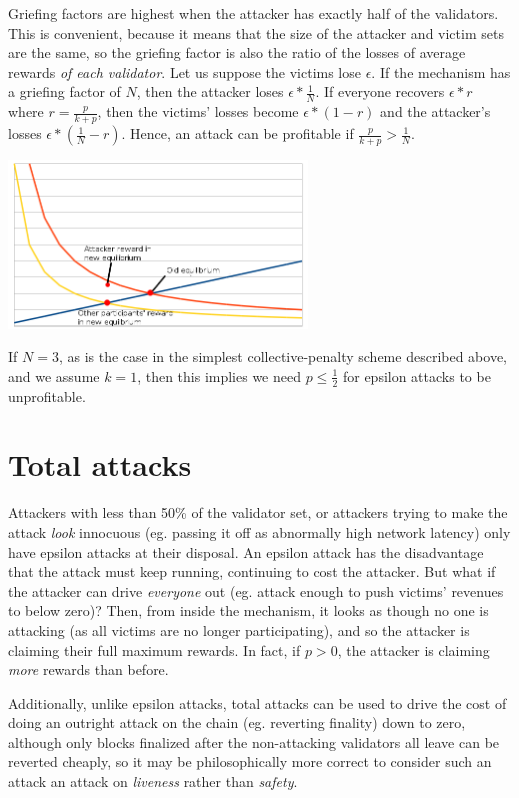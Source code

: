 \documentclass[12pt]{article}
\begin{document}
Griefing factors are highest when the attacker has exactly half of the validators. This is convenient, because it means that the size of the attacker and victim sets are the same, so the griefing factor is also the ratio of the losses of average rewards \emph{of each validator}. Let us suppose the victims lose $\epsilon$. If the mechanism has a griefing factor of $N$, then the attacker loses $\epsilon * \frac{1}{N}$. If everyone recovers $\epsilon * r$ where $r = \frac{p}{k+p}$, then the victims' losses become $\epsilon * (1-r)$ and the attacker's losses $\epsilon * (\frac{1}{N} - r)$. Hence, an attack can be profitable if $\frac{p}{k+p} > \frac{1}{N}$.

\includegraphics[width=300px]{disc_chart3.png}

If $N = 3$, as is the case in the simplest collective-penalty scheme described above, and we assume $k=1$, then this implies we need $p \le \frac{1}{2}$ for epsilon attacks to be unprofitable.

\section{Total attacks}

Attackers with less than 50\% of the validator set, or attackers trying to make the attack \emph{look} innocuous (eg. passing it off as abnormally high network latency) only have epsilon attacks at their disposal. An epsilon attack has the disadvantage that the attack must keep running, continuing to cost the attacker. But what if the attacker can drive \emph{everyone} out (eg. attack enough to push victims' revenues to below zero)? Then, from inside the mechanism, it looks as though no one is attacking (as all victims are no longer participating), and so the attacker is claiming their full maximum rewards. In fact, if $p > 0$, the attacker is claiming \emph{more} rewards than before.

Additionally, unlike epsilon attacks, total attacks can be used to drive the cost of doing an outright attack on the chain (eg. reverting finality) down to zero, although only blocks finalized after the non-attacking validators all leave can be reverted cheaply, so it may be philosophically more correct to consider such an attack an attack on \emph{liveness} rather than \emph{safety}.
\end{document}
